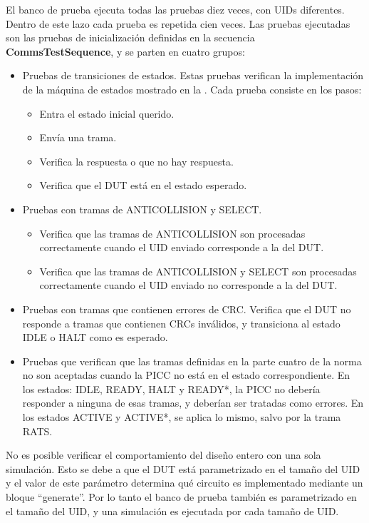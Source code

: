 \documentclass[a4paper, twoside, 11pt]{report}
\begin{document}
El banco de prueba ejecuta todas las pruebas diez veces, con UIDs diferentes. Dentro de este lazo cada prueba es repetida cien veces. Las pruebas ejecutadas son las pruebas de inicialización definidas en la secuencia \textbf{CommsTestSequence}, y se parten en cuatro grupos:

\begin{itemize}
  \item Pruebas de transiciones de estados. Estas pruebas verifican la implementación de la máquina de estados mostrado en la . Cada prueba consiste en los pasos:
  \begin{itemize}
    \item Entra el estado inicial querido.
    \item Envía una trama.
    \item Verifica la respuesta o que no hay respuesta.
    \item Verifica que el DUT está en el estado esperado.
  \end{itemize}
  \item Pruebas con tramas de ANTICOLLISION y SELECT.
  \begin{itemize}
    \item Verifica que las tramas de ANTICOLLISION son procesadas correctamente cuando el UID enviado corresponde a la del DUT.
    \item Verifica que las tramas de ANTICOLLISION y SELECT son procesadas correctamente cuando el UID enviado no corresponde a la del DUT.
  \end{itemize}
  \item Pruebas con tramas que contienen errores de CRC. Verifica que el DUT no responde a tramas que contienen CRCs inválidos, y transiciona al estado IDLE o HALT como es esperado.
  \item Pruebas que verifican que las tramas definidas en la parte cuatro de la norma no son aceptadas cuando la PICC no está en el estado correspondiente. En los estados: IDLE, READY, HALT y READY*, la PICC no debería responder a ninguna de esas tramas, y deberían ser tratadas como errores. En los estados ACTIVE y ACTIVE*, se aplica lo mismo, salvo por la trama RATS.
\end{itemize}

No es posible verificar el comportamiento del diseño entero con una sola simulación. Esto se debe a que el DUT está parametrizado en el tamaño del UID y el valor de este parámetro determina qué circuito es implementado mediante un bloque “generate”. Por lo tanto el banco de prueba también es parametrizado en el tamaño del UID, y una simulación es ejecutada por cada tamaño de UID.
\end{document}
